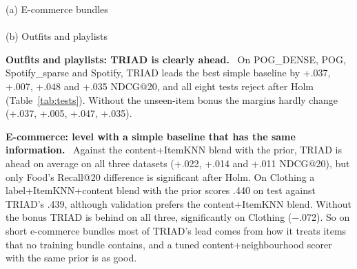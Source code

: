 \documentclass[runningheads]{llncs}
\renewcommand{\paragraph}[1]{\smallskip\noindent\textbf{#1}\ }
\begin{document}
\begin{table}[t]
\centering
\caption{Recall@20 and NDCG@20 on clean test queries (learned models: mean of three seeds). Simple baselines use the
frequency prior with its weight chosen on validation ($\lambda=0$ allowed). Bold: best; underlined: second best
(TRIAD w/o bonus excluded). Improv.: TRIAD relative to the best baseline on test in that column.
$^\dagger$RaMen's published number on the same split files, all test queries (TRIAD on all queries: POG .053 / .031,
Spotify .168 / .283). $^\ddagger$CLHE on full Spotify: one of three seeds finished, all test queries.}
\label{tab:main}
\setlength{\tabcolsep}{4pt}
\scriptsize
(a) E-commerce bundles\\[2pt]
\\[6pt]
(b) Outfits and playlists\\[2pt]
\resizebox{\textwidth}{!}{}
\end{table}

\begin{table}[t]
\centering
\caption{Paired tests on clean test queries: $\Delta$ NDCG@20 with a 95\% cluster-bootstrap interval and
Holm-corrected sign-flip $p$ (bold: $p<.05$). Best simple: chosen on validation over all thirteen methods
($^{*}$: with the frequency prior). Holm over 14 tests (7 datasets $\times$ 2 metrics) per comparison against the
best simple baseline.}
\label{tab:tests}
\setlength{\tabcolsep}{3pt}
\scriptsize
\resizebox{\textwidth}{!}{}
\end{table}

\paragraph{Outfits and playlists: TRIAD is clearly ahead.} On POG\_DENSE, POG, Spotify\_sparse and Spotify, TRIAD
leads the best simple baseline by +.037, +.007, +.048 and +.035 NDCG@20, and all eight tests reject after Holm
(Table~\ref{tab:tests}). Without the unseen-item bonus the margins hardly change (+.037, +.005, +.047, +.035).

\paragraph{E-commerce: level with a simple baseline that has the same information.} Against the content+ItemKNN
blend with the prior, TRIAD is ahead on average on all three datasets (+.022, +.014 and +.011 NDCG@20), but only
Food's Recall@20 difference is significant after Holm. On Clothing a label+ItemKNN+content blend with the prior scores .440 on
test against TRIAD's .439, although validation prefers the content+ItemKNN blend. Without the bonus TRIAD is behind
on all three, significantly on Clothing ($-$.072). So on short e-commerce bundles most of TRIAD's lead comes from
how it treats items that no training bundle contains, and a tuned content+neighbourhood scorer with the same prior is
as good.
\end{document}
